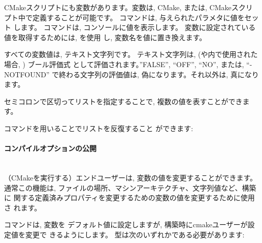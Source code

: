 \documentclass[uplatex,11pt,a4paper,landscape,dvipdfmx]{jsarticle} %
\newcommand{\sectiontitle}[1]{\paragraph{#1} \ \\} %
\begin{document}
\begin{multicols}{2}
CMakeスクリプトにも変数があります。変数は, CMake, または, CMakeスクリ
プト中で定義することが可能です。
 コマンドは, 与えられたパラメタに値をセット
します。
コマンドは, コンソールに値を表示します。
変数に設定されている値を取得するためには, を使用
し, 変数名を値に置き換えます。



すべての変数値は, テキスト文字列です。 テキスト文字列は,
(や内で使用された場合, ) ブール評価式
として評価されます。''FALSE'', ``OFF'', ``NO'', または, ``-NOTFOUND''
で終わる文字列の評価値は, 偽になります。それ以外は, 真になります。

セミコロンで区切ってリストを指定することで, 複数の値を表すことができま
す。



コマンドを用いることでリストを反復すること
ができます:

			
\sectiontitle{コンパイルオプションの公開}
			

（CMakeを実行する）エンドユーザーは, 変数の値を変更することができます。
通常この機能は, ファイルの場所、マシンアーキテクチャ、文字列値など、構築に
関する定義済みプロパティを変更するための変数の値を変更するために使用さ
れます。


コマンドは, 変数を
デフォルト値に設定しますが, 構築時にcmakeユーザーが設定値を変更で
きるようにします。
型は次のいずれかである必要があります:


\end{multicols}
\end{document}
